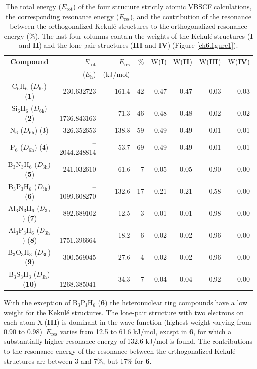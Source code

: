 \begin{table}[htp]
\caption{The total energy ($E_\mathrm{tot}$) of the four structure strictly atomic VBSCF calculations,
the corresponding resonance energy ($E_\mathrm{res}$), and the contribution of the resonance between the orthogonalized Kekul\'e structures to the orthogonalized resonance energy (\%).
The last four columns contain the weights of the Kekul\'e structures (\textbf{I} and \textbf{II}) and
the lone-pair structures (\textbf{III} and \textbf{IV}) (Figure \ref{ch6.figure1}).}
\begin{center}
\begin{tabular}{ c r r r r r r r }
\hline
\textbf{Compound}&
$E_{\mathrm{tot}}$&
$E_{\mathrm{res}}$&
\%&
W(\textbf{I})&
W(\textbf{II})&
W(\textbf{III})&
W(\textbf{IV})\\
&($E_{\mathrm{h}}$)&(kJ/mol)&&&&&\\
\hline
C$_6$H$_6$ ($D_\mathrm{6h}$) (\textbf{1})&--230.632723&161.4&42&0.47&0.47&0.03&0.03\\
Si$_6$H$_6$ ($D_\mathrm{6h}$) (\textbf{2})&--1736.843163&71.3&46&0.48&0.48&0.02&0.02\\
N$_6$ ($D_\mathrm{6h}$) (\textbf{3})&--326.352653&138.8&59&0.49&0.49&0.01&0.01\\
P$_6$ ($D_\mathrm{6h}$) (\textbf{4})&--2044.248814&53.7&69&0.49&0.49&0.01&0.01\\
B$_3$N$_3$H$_6$ ($D_\mathrm{3h}$) (\textbf{5})&--241.032610&61.6&7&0.05&0.05&0.90&0.00\\
B$_3$P$_3$H$_6$ ($D_\mathrm{3h}$) (\textbf{6})&--1099.608270&132.6&17&0.21&0.21&0.58&0.00\\
Al$_3$N$_3$H$_6$ ($D_\mathrm{3h}$) (\textbf{7})&--892.689102&12.5&3&0.01&0.01&0.98&0.00\\
Al$_3$P$_3$H$_6$ ($D_\mathrm{3h}$) (\textbf{8})&--1751.396664&18.2&6&0.02&0.02&0.96&0.00\\
B$_3$O$_3$H$_3$ ($D_\mathrm{3h}$) (\textbf{9})&--300.569045&27.6&4&0.02&0.02&0.96&0.00\\
B$_3$S$_3$H$_3$ ($D_\mathrm{3h}$) (\textbf{10})&--1268.385041&34.3&7&0.04&0.04&0.92&0.00\\
\end{tabular}
\label{ch6.table2}
\end{center}
\end{table}

With the exception of B$_3$P$_3$H$_6$ (\textbf{6}) the heteronuclear ring compounds have a low
weight for the Kekul\'e structures. The lone-pair structure with two electrons
on each atom X (\textbf{III}) is dominant in the wave function (highest weight varying from 0.90 to 0.98).
$E_{\mathrm{res}}$ varies from 12.5 to 61.6 kJ/mol, except in \textbf{6}, for
which a substantially higher resonance energy of 132.6 kJ/mol is found. The contributions
to the resonance energy of the resonance between the orthogonalized
Kekul\'e structures are between 3 and 7\%, but 17\% for \textbf{6}.

